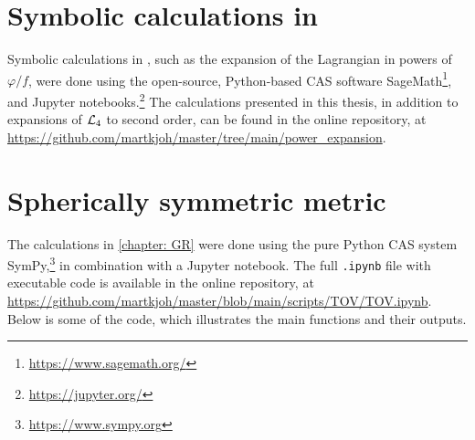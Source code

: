  

\section{Symbolic calculations in \chpt}
\label{section: symbolic calculations}

Symbolic calculations in \chpt, such as the expansion of the Lagrangian in powers of $\varphi/f$, were done using the open-source, Python-based CAS software SageMath\footnote{\url{https://www.sagemath.org/}}, and Jupyter notebooks.\footnote{\url{https://jupyter.org/}}
The calculations presented in this thesis, in addition to expansions of $\mathcal{L}_4$ to second order, can be found in the online repository, at \url{https://github.com/martkjoh/master/tree/main/power_expansion}.



\section{Spherically symmetric metric}

The calculations in \autoref{chapter: GR} were done using the pure Python CAS system SymPy,\footnote{\url{https://www.sympy.org}} in combination with a Jupyter notebook.
The full \texttt{.ipynb} file with executable code is available in the online repository, at \url{https://github.com/martkjoh/master/blob/main/scripts/TOV/TOV.ipynb}.
Below is some of the code, which illustrates the main functions and their outputs.





